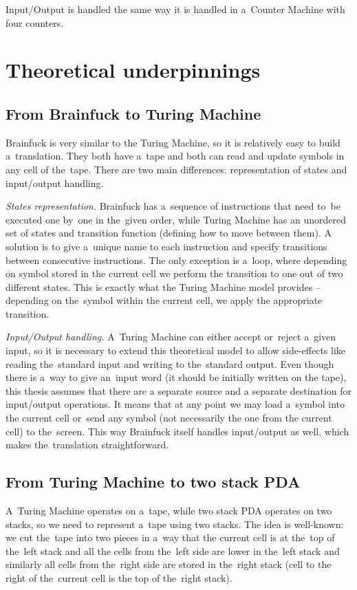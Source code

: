 \documentclass[english,shortabstract,mgr]{iithesis}
\begin{document}
Input/Output is handled the same way it is handled in a~Counter Machine with four counters.


\chapter{Theoretical underpinnings}

\section {From Brainfuck to Turing Machine}

Brainfuck is very similar to the Turing Machine, so it is relatively easy to build
a~translation. They both have a~tape and both can read and update symbols in any
cell of the~tape. There are two main differences: representation of states and
input/output handling.

\textit{States representation.}
Brainfuck has a~sequence of instructions that need to~be
executed one by~one in the~given order, while Turing Machine has an unordered set
of states and transition function (defining how to move between them). A solution
is to give a~unique name to each instruction and specify transitions between
consecutive instructions. The only exception is a~loop, where depending on
symbol stored in the current cell we perform the transition to one out of two different states.
This is exactly what the Turing Machine model provides -- depending on the~symbol
within the current cell, we apply the appropriate transition.

\textit{Input/Output handling.}
A~Turing Machine can either accept or~reject a~given input, so it is necessary to
extend this theoretical model to allow side-effects like reading the~standard
input and writing to the~standard output. Even though there is a~way to give
an~input word (it should be initially written on the tape), this thesis assumes
that there are a separate source and a separate destination for input/output operations.
It means that at any point we may load a~symbol into the current cell or~send
any symbol (not necessarily the one from the current cell) to the~screen. This
way Brainfuck itself handles input/output as well, which makes the~translation straightforward.

\section {From Turing Machine to two stack PDA}

A~Turing Machine operates on a~tape, while two stack PDA operates on two stacks, so we need
to represent a~tape using two stacks. The idea is well-known: we cut the~tape into
two pieces in a~way that the current cell is at the~top of the~left stack and all
the cells from the~left side are lower in the~left stack and similarly all cells from the~right side
are stored in the~right stack (cell to the right of the~current cell is the top of the~right stack).
\end{document}
